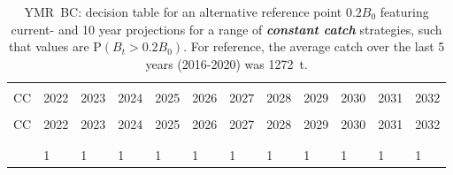 \documentclass[11pt]{book}
\newcommand{\itbf}[1]{\textit{\textbf{#1}}}
\begin{document}
\begin{longtable}[c]{>{\raggedright\let\newline\\\arraybackslash\hspace{0pt}}p{0.5in}>{\raggedleft\let\newline\\\arraybackslash\hspace{0pt}}p{0.5in}>{\raggedleft\let\newline\\\arraybackslash\hspace{0pt}}p{0.5in}>{\raggedleft\let\newline\\\arraybackslash\hspace{0pt}}p{0.53in}>{\raggedleft\let\newline\\\arraybackslash\hspace{0pt}}p{0.53in}>{\raggedleft\let\newline\\\arraybackslash\hspace{0pt}}p{0.53in}>{\raggedleft\let\newline\\\arraybackslash\hspace{0pt}}p{0.53in}>{\raggedleft\let\newline\\\arraybackslash\hspace{0pt}}p{0.53in}>{\raggedleft\let\newline\\\arraybackslash\hspace{0pt}}p{0.53in}>{\raggedleft\let\newline\\\arraybackslash\hspace{0pt}}p{0.53in}>{\raggedleft\let\newline\\\arraybackslash\hspace{0pt}}p{0.53in}>{\raggedleft\let\newline\\\arraybackslash\hspace{0pt}}p{0.53in}}
  \caption{YMR~BC: decision table for an alternative reference point $0.2 B_0$ featuring current- and 10 year projections for a range of \itbf{constant catch} strategies, such that values are P$(B_t > 0.2 B_0)$.  For reference, the average catch over the last 5 years (2016-2020) was 1272~t. } \label{tab:ymr.gmu.20B0.CCs}\\  \hline\\[-2.2ex]  CC  & 2022 & 2023 & 2024 & 2025 & 2026 & 2027 & 2028 & 2029 & 2030 & 2031 & 2032 \\[0.2ex]\hline\\[-1.5ex]  \endfirsthead   \hline  CC  & 2022 & 2023 & 2024 & 2025 & 2026 & 2027 & 2028 & 2029 & 2030 & 2031 & 2032 \\[0.2ex]\hline\\[-1.5ex]  \endhead  \hline\\[-2.2ex]   \endfoot  \hline \endlastfoot  0 & 1 & 1 & 1 & 1 & 1 & 1 & 1 & 1 & 1 & 1 & 1 \\ 

\end{longtable}
\end{document}
